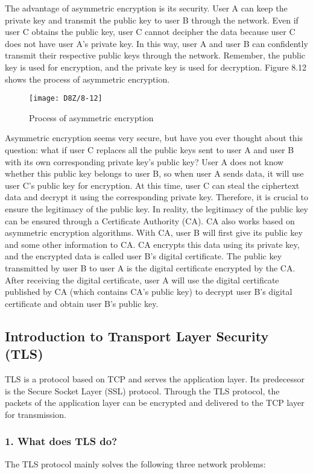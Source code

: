 \documentclass[a4paper,12pt]{book}
\begin{document}
The advantage of asymmetric encryption is its security. User A can keep the private key and transmit the public key to user B through the network. Even if user C obtains the public key, user C cannot decipher the data because user C does not have user A’s private key. In this way, user A and user B can confidently transmit their respective public keys through the network. Remember, the public key is used for encryption, and the private key is used for decryption. Figure 8.12 shows the process of asymmetric encryption.

\begin{figure}[!h]
    \centering
    \texttt{[image: D8Z/8-12]}
    \caption{Process of asymmetric encryption}
\end{figure}

Asymmetric encryption seems very secure, but have you ever thought about this question: what if user C replaces all the public keys sent to user A and user B with its own corresponding private key’s public key? User A does not know whether this public key belongs to user B, so when user A sends data, it will use user C’s public key for encryption. At this time, user C can steal the ciphertext data and decrypt it using the corresponding private key. Therefore, it is crucial to ensure the legitimacy of the public key. In reality, the legitimacy of the public key can be ensured through a Certificate Authority (CA). CA also works based on asymmetric encryption algorithms. With CA, user B will first give its public key and some other information to CA. CA encrypts this data using its private key, and the encrypted data is called user B’s digital certificate. The public key transmitted by user B to user A is the digital certificate encrypted by the CA. After receiving the digital certificate, user A will use the digital certificate published by CA (which contains CA’s public key) to decrypt user B’s digital certificate and obtain user B’s public key.

\subsection{Introduction to Transport Layer Security (TLS)}
TLS is a protocol based on TCP and serves the application layer. Its predecessor is the Secure Socket Layer (SSL) protocol. Through the TLS protocol, the packets of the application layer can be encrypted and delivered to the TCP layer for transmission.

\subsubsection{1. What does TLS do?}
The TLS protocol mainly solves the following three network problems:
\end{document}
